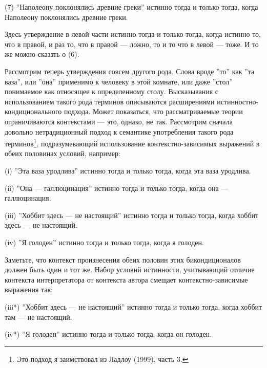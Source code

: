 \documentclass[11pt]{book}
\begin{document}
\smallskip

(7) ''Наполеону поклонялись древние греки'' истинно тогда и только тогда, когда Наполеону поклонялись древние греки.

\smallskip

Здесь утверждение в левой части истинно тогда и только тогда, когда истинно то, что в правой, и раз то, что в правой --- ложно, то и то что в левой --- тоже. И то же можно сказать о (6).

Рассмотрим теперь утверждения совсем другого рода. Слова вроде ''то'' как ''та ваза'', или ''она'' применимо к человеку в этой комнате, или даже ''стол'' понимаемое как относящее к определенному столу. Высказывания с использованием такого рода терминов описываются расширениями истинностно-кондиционального подхода. Может показаться, что рассматриваемые теории ограничиваются контекстами --- это, однако, не так. Рассмотрим сначала довольно нетрадиционный подход к семантике употребления такого рода терминов\footnote{Это подход я заимствовал из Ладлоу (1999), часть 3.}, подразумевающий использование контекстно-зависимых выражений в обеих половинах условий, например:

\smallskip

(i) ''Эта ваза уродлива'' истинно тогда и только тогда, когда эта ваза уродлива.

(ii) ''Она --- галлюцинация'' истинно тогда и только тогда, когда она --- галлюцинация.

(iii) ''Хоббит здесь --- не настоящий'' истинно тогда и только тогда, когда хоббит здесь --- не настоящий.

(iv) ''Я голоден'' истинно тогда и только тогда, когда я голоден.

\smallskip

Заметьте, что контекст произнесения обеих половин этих бикондиционалов должен быть один и тот же. Набор условий истинности, учитывающий отличие контекста интерпретатора от контекста автора смещает контекстно-зависимые выражения так:

\smallskip

(iii*) ''Хоббит здесь --- не настоящий'' истинно тогда и только тогда, когда хоббит там --- не настоящий.

(iv*) ''Я голоден'' истинно тогда и только тогда, когда он голоден.

\smallskip
\end{document}

